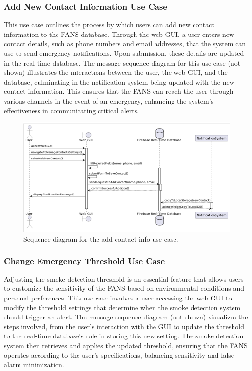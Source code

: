 \subsubsection{Add New Contact Information Use Case}

This use case outlines the process by which users can add new contact information to the FANS database. Through the web
GUI, a user enters new contact details, such as phone numbers and email addresses, that the system can use to send
emergency notifications. Upon submission, these details are updated in the real-time database. The message sequence
diagram for this use case (not shown) illustrates the interactions between the user, the web GUI, and the database,
culminating in the notification system being updated with the new contact information. This ensures that the FANS can
reach the user through various channels in the event of an emergency, enhancing the system's effectiveness in
communicating critical alerts.

\begin{figure}[H]
    \centering
    \includegraphics[width=\linewidth]{../assets/AddingNewContactInformationSequenceDiagram.png}
    \caption{Sequence diagram for the add contact info use case.}
\end{figure}

\subsubsection{Change Emergency Threshold Use Case}

Adjusting the smoke detection threshold is an essential feature that allows users to customize the sensitivity of the
FANS based on environmental conditions and personal preferences. This use case involves a user accessing the web GUI to
modify the threshold settings that determine when the smoke detection system should trigger an alert. The message
sequence diagram (not shown) visualizes the steps involved, from the user's interaction with the GUI to update the
threshold to the real-time database's role in storing this new setting. The smoke detection system then retrieves and
applies the updated threshold, ensuring that the FANS operates according to the user's specifications, balancing
sensitivity and false alarm minimization.

